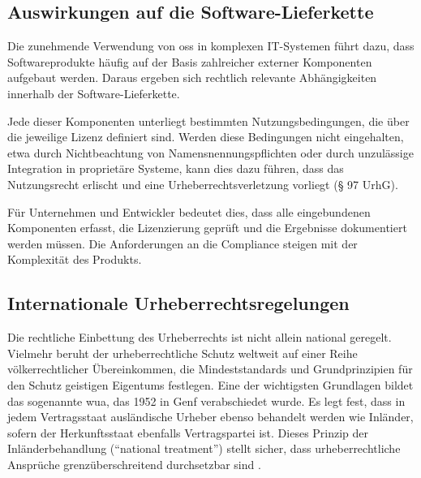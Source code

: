 
\subsection{Auswirkungen auf die Software-Lieferkette}

Die zunehmende Verwendung von \gls{oss} in komplexen IT-Systemen führt dazu, dass Softwareprodukte häufig auf der Basis zahlreicher externer Komponenten aufgebaut werden.
Daraus ergeben sich rechtlich relevante Abhängigkeiten innerhalb der Software-Lieferkette.

Jede dieser Komponenten unterliegt bestimmten Nutzungsbedingungen, die über die jeweilige Lizenz definiert sind.
Werden diese Bedingungen nicht eingehalten, etwa durch Nichtbeachtung von Namensnennungspflichten oder durch unzulässige Integration in proprietäre Systeme, kann dies dazu führen, dass das Nutzungsrecht erlischt und eine Urheberrechtsverletzung vorliegt (§ 97 UrhG).

Für Unternehmen und Entwickler bedeutet dies, dass alle eingebundenen Komponenten erfasst, die Lizenzierung geprüft und die Ergebnisse dokumentiert werden müssen.
Die Anforderungen an die Compliance steigen mit der Komplexität des Produkts.


\subsection{Internationale Urheberrechtsregelungen}

Die rechtliche Einbettung des Urheberrechts ist nicht allein national geregelt.
Vielmehr beruht der urheberrechtliche Schutz weltweit auf einer Reihe völkerrechtlicher Übereinkommen, die Mindeststandards und Grundprinzipien für den Schutz geistigen Eigentums festlegen.
Eine der wichtigsten Grundlagen bildet das sogenannte \gls{wua}, das 1952 in Genf verabschiedet wurde.
Es legt fest, dass in jedem Vertragsstaat ausländische Urheber ebenso behandelt werden wie Inländer, sofern der Herkunftsstaat ebenfalls Vertragspartei ist.
Dieses Prinzip der Inländerbehandlung (\enquote{national treatment}) stellt sicher, dass urheberrechtliche Ansprüche grenzüberschreitend durchsetzbar sind \autocite{meckel_definition_nodate}.

